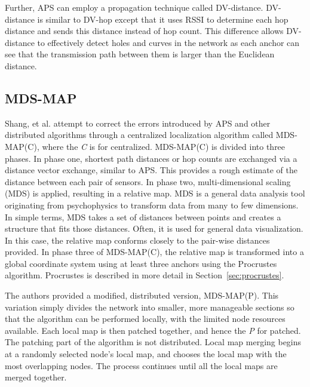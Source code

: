 Further, APS can employ a propagation technique called DV-distance.  DV-distance is similar to DV-hop except that it uses RSSI to determine each hop distance and sends this distance instead of hop count.  This difference allows DV-distance to effectively detect holes and curves in the network as each anchor can see that the transmission path between them is larger than the Euclidean distance.

\subsection{MDS-MAP}
Shang, et al. attempt to correct the errors introduced by APS and other distributed algorithms through a centralized localization algorithm called MDS-MAP(C)\cite{MDS-MAP}, where the \emph{C} is for centralized.  MDS-MAP(C) is divided into three phases.  In phase one, shortest path distances or hop counts are exchanged via a distance vector exchange, similar to APS.  This provides a rough estimate of the distance between each pair of sensors.  In phase two, multi-dimensional scaling (MDS) is applied, resulting in a relative map.  MDS is a general data analysis tool originating from psychophysics\cite[p.2]{MDS-MAP} to transform data from many to few dimensions.  In simple terms, MDS takes a set of distances between points and creates a structure that fits those distances.  Often, it is used for general data visualization.  In this case, the relative map conforms closely to the pair-wise distances provided.  In phase three of MDS-MAP(C), the relative map is transformed into a global coordinate system using at least three anchors using the Procrustes algorithm.  Procrustes is described in more detail in Section~\ref{sec:procrustes}.

The authors provided a modified, distributed version, MDS-MAP(P)\cite{MDS-MAP-P}.  This variation simply divides the network into smaller, more manageable sections so that the algorithm can be performed locally, with the limited node resources available.  Each local map is then patched together, and hence the \emph{P} for patched.  The patching part of the algorithm is not distributed.  Local map merging begins at a randomly selected node's local map, and chooses the local map with the most overlapping nodes.  The process continues until all the local maps are merged together.  


